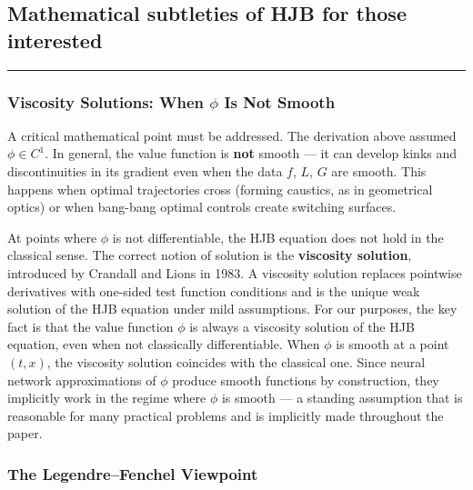 \documentclass{article}
\begin{document}
\subsection{Mathematical subtleties of HJB for those interested}
\label{sec:optimized-hamiltonian}

\medskip\hrule\medskip

\subsubsection{Viscosity Solutions: When $\phi$ Is Not Smooth}

\begin{mathrequirementsbox}
A critical mathematical point must be addressed. The derivation above assumed $\phi \in C^1$. In general, the value function is \textbf{not} smooth — it can develop kinks and discontinuities in its gradient even when the data $f$, $L$, $G$ are smooth. This happens when optimal trajectories cross (forming caustics, as in geometrical optics) or when bang-bang optimal controls create switching surfaces.

At points where $\phi$ is not differentiable, the HJB equation does not hold in the classical sense. The correct notion of solution is the \textbf{viscosity solution}, introduced by Crandall and Lions in 1983. A viscosity solution replaces pointwise derivatives with one-sided test function conditions and is the unique weak solution of the HJB equation under mild assumptions. For our purposes, the key fact is that the value function $\phi$ is always a viscosity solution of the HJB equation, even when not classically differentiable. When $\phi$ is smooth at a point $(t,x)$, the viscosity solution coincides with the classical one. Since neural network approximations of $\phi$ produce smooth functions by construction, they implicitly work in the regime where $\phi$ is smooth — a standing assumption that is reasonable for many practical problems and is implicitly made throughout the paper.
\end{mathrequirementsbox}


\subsubsection{The Legendre--Fenchel Viewpoint}
\label{sec:legendre-fenchel-viewpoint}
\end{document}
